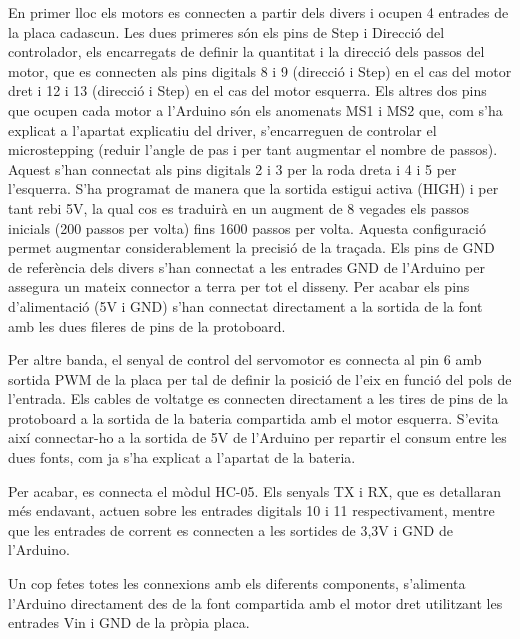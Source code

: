 En primer lloc els motors es connecten a partir dels divers i ocupen 4 entrades de la placa cadascun. Les dues primeres són els pins de Step i Direcció del controlador, els encarregats de definir la quantitat i la direcció dels passos del motor, que es connecten als pins digitals 8 i 9 (direcció i Step) en el cas del motor dret i 12 i 13 (direcció i Step) en el cas del motor esquerra. Els altres dos pins que ocupen cada motor a l’Arduino són els anomenats MS1 i MS2 que, com s’ha explicat a l’apartat explicatiu del driver, s’encarreguen de controlar el microstepping (reduir l’angle de pas i per tant augmentar el nombre de passos). Aquest s’han connectat als pins digitals 2 i 3 per la roda dreta i 4 i 5 per l’esquerra. S’ha programat de manera que la sortida estigui activa (HIGH) i per tant rebi 5V, la qual cos es traduirà en un augment de 8 vegades els passos inicials (200 passos per volta) fins 1600 passos per volta. Aquesta configuració permet augmentar considerablement la precisió de la traçada. Els pins de GND de referència dels divers s’han connectat a les entrades GND de l’Arduino per assegura un mateix connector a terra per tot el disseny. Per acabar els pins d’alimentació (5V i GND) s’han connectat directament a la sortida de la font amb les dues fileres de pins de la protoboard. 

Per altre banda, el senyal de control del servomotor es connecta al pin 6 amb sortida PWM de la placa per tal de definir la posició de l’eix en funció del pols de l’entrada. Els cables de voltatge es connecten directament a les tires de pins de la protoboard a la sortida de la bateria compartida amb el motor esquerra.  S’evita així connectar-ho a la sortida de 5V de l’Arduino per repartir el consum entre les dues fonts, com ja s’ha explicat a l’apartat de la bateria. 

Per acabar, es connecta el mòdul HC-05. Els senyals TX i RX, que es detallaran més endavant, actuen sobre les entrades digitals 10 i 11 respectivament, mentre que les entrades de corrent es connecten a les sortides de 3,3V i GND de l’Arduino. 

Un cop fetes totes les connexions amb els diferents components, s’alimenta l’Arduino directament des de la font compartida amb el motor dret utilitzant les entrades Vin i GND de la pròpia placa. 

